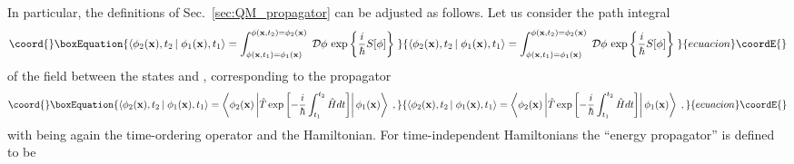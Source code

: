 \documentclass[a4paper,preprint,draft,showpacs,amsmath,amsfonts,amssymb,aps,prd]{revtex4}%
\begin{document}
In particular, the definitions of Sec.~\ref{sec:QM_propagator}
can be adjusted as follows.
Let us consider the path integral 
\begin{equation}\coord{}\boxEquation{ 
\left\langle 
\phi_{2} ({\bf x}), t_{2} \left| \right. 
\phi_{1}({\bf x}), t_{1}
\right\rangle   
 = 
\int_{\phi( {\bf x}, t_{1})  
=  \phi_{1} ( {\bf x}) }^{ \phi({\bf x} , t_{2}) 
 =  \phi_{2} ( {\bf x} ) }  
 \;  
{\cal D}  \phi  \,
\exp \left\{ {\frac{i}{\hbar} S [\phi]} \right\}
\;  
\label{eq:position_propagator}
}{ 
\left\langle 
\phi_{2} ({\bf x}), t_{2} \left| \right. 
\phi_{1}({\bf x}), t_{1}
\right\rangle   
 = 
\int_{\phi( {\bf x}, t_{1})  
=  \phi_{1} ( {\bf x}) }^{ \phi({\bf x} , t_{2}) 
 =  \phi_{2} ( {\bf x} ) }  
 \;  
{\cal D}  \phi  \,
\exp \left\{ {\frac{i}{\hbar} S [\phi]} \right\}
\;  
}{ecuacion}\coordE{}\end{equation}
of the field \coordHE{} between the states 
\coordHE{}
and
\coordHE{}, 
corresponding to the propagator 
\begin{equation}\coord{}\boxEquation{ 
\left\langle 
\phi_{2} ({\bf x}), t_{2} \left| \right. 
\phi_{1}({\bf x}), t_{1}
\right\rangle 
=
\left\langle \phi_{2}  ({\bf x}) \left| 
\hat{T}
\exp \left[
 -\frac{i}{\hbar} \int_{t_{1}}^{t_{2}}
\hat{H} dt 
\right]
\right| \phi_{1}  ({\bf x}) \right\rangle   
\; ,
\label{eq:position_propagator2}
}{ 
\left\langle 
\phi_{2} ({\bf x}), t_{2} \left| \right. 
\phi_{1}({\bf x}), t_{1}
\right\rangle 
=
\left\langle \phi_{2}  ({\bf x}) \left| 
\hat{T}
\exp \left[
 -\frac{i}{\hbar} \int_{t_{1}}^{t_{2}}
\hat{H} dt 
\right]
\right| \phi_{1}  ({\bf x}) \right\rangle   
\; ,
}{ecuacion}\coordE{}\end{equation}
with \coordHE{} being again the time-ordering operator
and  \coordHE{} the Hamiltonian.
For time-independent  Hamiltonians
the ``energy propagator'' is defined to be
\end{document}
